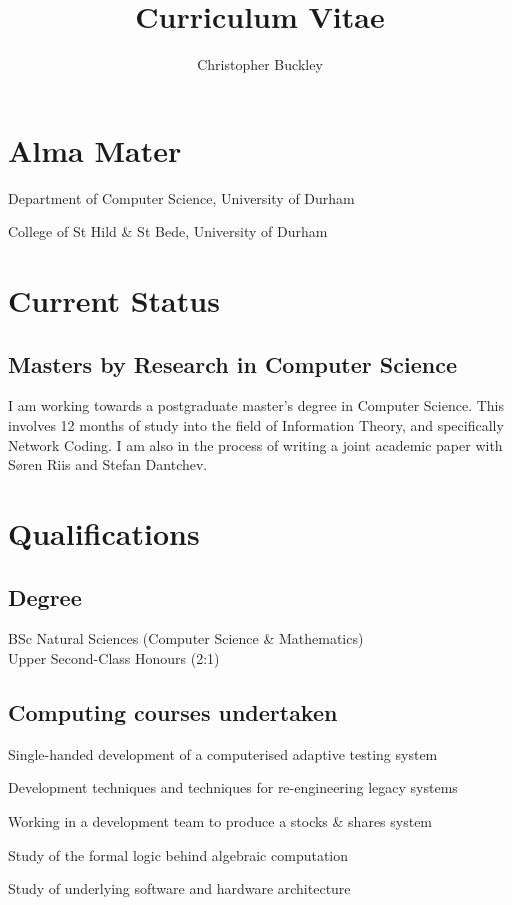 \documentclass{cv}
\title{Curriculum Vitae}
\author{Christopher Buckley}
\begin{document}
\section{Alma Mater}

\begin{description}[leftmargin=!,labelwidth=\widthof{\bfseries 2006--present}]
\item[2006--present] Department of Computer Science, University of Durham
\item[2003--2006] College of St Hild \& St Bede, University of Durham
\end{description}

\section{Current Status}

\subsection*{Masters by Research in Computer Science}

I am working towards a postgraduate master's degree in Computer Science. This involves 12 months of study into the field of Information Theory, and specifically Network Coding. I am also in the process of writing a joint academic paper with S{\o}ren Riis and Stefan Dantchev.

\section{Qualifications}

\subsection*{Degree}

BSc Natural Sciences (Computer Science \& Mathematics)\\
Upper Second-Class Honours (2:1)

\subsection*{Computing courses undertaken}

\begin{description}[style=nextline]
\item[Computer science project] Single-handed development of a computerised adaptive testing system
\item[Software Engineering] Development techniques and techniques for re-engineering legacy systems
\item[Group project] Working in a development team to produce a stocks \& shares system
\item[Formal Aspects] Study of the formal logic behind algebraic computation
\item[Computer Systems] Study of underlying software and hardware architecture
\end{description}
\end{document}
